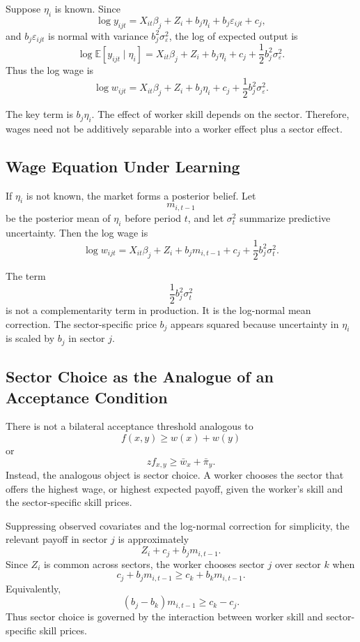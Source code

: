 \documentclass[11pt]{article}
\newcommand{\E}{\mathbb{E}}
\newcommand{\1}{\mathbf{1}}
\begin{document}
Suppose $\eta_i$ is known. Since
\[
\log y_{ijt}
=
X_{it}\beta_j+Z_i+b_j\eta_i+b_j\varepsilon_{ijt}+c_j,
\]
and $b_j\varepsilon_{ijt}$ is normal with variance $b_j^2\sigma_\varepsilon^2$, the log of expected output is
\[
\log \E[y_{ijt}\mid \eta_i]
=
X_{it}\beta_j+Z_i+b_j\eta_i+c_j
+\frac{1}{2}b_j^2\sigma_\varepsilon^2.
\]
Thus the log wage is
\[
\boxed{
\log w_{ijt}
=
X_{it}\beta_j+Z_i+b_j\eta_i+c_j
+\frac{1}{2}b_j^2\sigma_\varepsilon^2.
}
\]

The key term is $b_j\eta_i$. The effect of worker skill depends on the sector. Therefore, wages need not be additively separable into a worker effect plus a sector effect.

\subsection{Wage Equation Under Learning}

If $\eta_i$ is not known, the market forms a posterior belief. Let
\[
m_{i,t-1}
\]
be the posterior mean of $\eta_i$ before period $t$, and let $\sigma_t^2$ summarize predictive uncertainty. Then the log wage is
\[
\boxed{
\log w_{ijt}
=
X_{it}\beta_j+Z_i+b_jm_{i,t-1}+c_j
+\frac{1}{2}b_j^2\sigma_t^2.
}
\]

The term
\[
\frac{1}{2}b_j^2\sigma_t^2
\]
is not a complementarity term in production. It is the log-normal mean correction. The sector-specific price $b_j$ appears squared because uncertainty in $\eta_i$ is scaled by $b_j$ in sector $j$.

\subsection{Sector Choice as the Analogue of an Acceptance Condition}

There is not a bilateral acceptance threshold analogous to
\[
f(x,y)\geq w(x)+w(y)
\]
or
\[
z f_{x,y}\geq \bar w_x+\bar \pi_y.
\]
Instead, the analogous object is sector choice. A worker chooses the sector that offers the highest wage, or highest expected payoff, given the worker's skill and the sector-specific skill prices.

Suppressing observed covariates and the log-normal correction for simplicity, the relevant payoff in sector $j$ is approximately
\[
Z_i+c_j+b_jm_{i,t-1}.
\]
Since $Z_i$ is common across sectors, the worker chooses sector $j$ over sector $k$ when
\[
c_j+b_jm_{i,t-1}
\geq
c_k+b_km_{i,t-1}.
\]
Equivalently,
\[
(b_j-b_k)m_{i,t-1}
\geq
c_k-c_j.
\]
Thus sector choice is governed by the interaction between worker skill and sector-specific skill prices.
\end{document}
